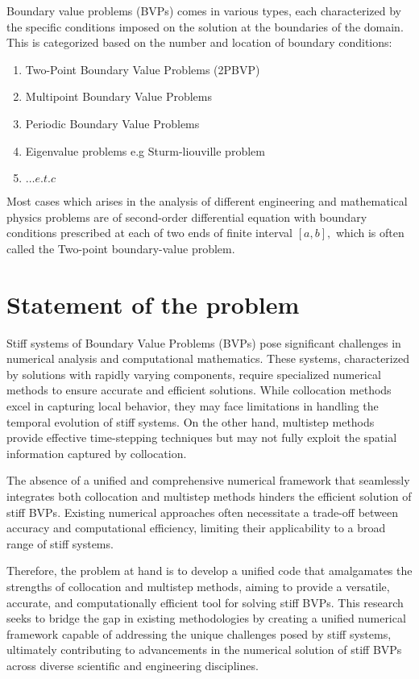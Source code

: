 Boundary value problems (BVPs) comes in various types, each characterized by the specific conditions imposed on the solution at the boundaries of the domain. This is categorized based on the number and location of boundary conditions:

\begin{enumerate}
    \item Two-Point Boundary Value Problems (2PBVP)
    \item Multipoint Boundary Value Problems
    \item Periodic Boundary Value Problems
    \item Eigenvalue problems e.g Sturm-liouville problem 
    \item $\dots e.t.c$
\end{enumerate}

Most cases which arises in the analysis of different engineering and mathematical physics problems are of second-order differential equation with boundary conditions prescribed at each of two ends of finite interval $[a,b],$ which is often called the Two-point boundary-value problem.


\section{Statement of the problem}
\label{sec:statements of problem}
Stiff systems of Boundary Value Problems (BVPs) pose significant challenges in numerical analysis and computational mathematics. These systems, characterized by solutions with rapidly varying components, require specialized numerical methods to ensure accurate and efficient solutions. While collocation methods excel in capturing local behavior, they may face limitations in handling the temporal evolution of stiff systems. On the other hand, multistep methods provide effective time-stepping techniques but may not fully exploit the spatial information captured by collocation.

The absence of a unified and comprehensive numerical framework that seamlessly integrates both collocation and multistep methods hinders the efficient solution of stiff BVPs. Existing numerical approaches often necessitate a trade-off between accuracy and computational efficiency, limiting their applicability to a broad range of stiff systems.

Therefore, the problem at hand is to develop a unified code that amalgamates the strengths of collocation and multistep methods, aiming to provide a versatile, accurate, and computationally efficient tool for solving stiff BVPs. This research seeks to bridge the gap in existing methodologies by creating a unified numerical framework capable of addressing the unique challenges posed by stiff systems, ultimately contributing to advancements in the numerical solution of stiff BVPs across diverse scientific and engineering disciplines.


